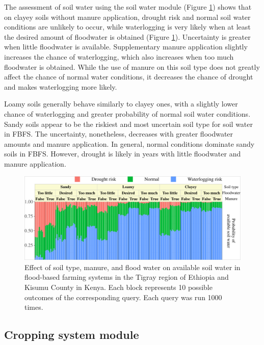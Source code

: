 \documentclass[]{elsarticle} %
\begin{document}
The assessment of soil water using the soil water module (Figure \ref{fig:fig6}) shows that on clayey soils without manure application, drought risk and normal soil water conditions are unlikely to occur, while waterlogging is very likely when at least the desired amount of floodwater is obtained (Figure \ref{fig:fig6}). Uncertainty is greater when little floodwater is available. Supplementary manure application slightly increases the chance of waterlogging, which also increases when too much floodwater is obtained. While the use of manure on this soil type does not greatly affect the chance of normal water conditions, it decreases the chance of drought and makes waterlogging more likely.

Loamy soils generally behave similarly to clayey ones, with a slightly lower chance of waterlogging and greater probability of normal soil water conditions. Sandy soils appear to be the riskiest and most uncertain soil type for soil water in FBFS. The uncertainty, nonetheless, decreases with greater floodwater amounts and manure application. In general, normal conditions dominate sandy soils in FBFS. However, drought is likely in years with little floodwater and manure application.

\begin{figure}[!h]

{\centering \includegraphics[width=1\linewidth,]{figures/Modelling_FBFS_factor_of_soil_water} 

}

\caption{Effect of soil type, manure, and flood water on available soil water in flood-based farming systems in the Tigray region of Ethiopia and Kisumu County in Kenya. Each block represents 10 possible outcomes of the corresponding query. Each query was run 1000 times.}\label{fig:fig6}
\end{figure}

\hypertarget{ref43}{%
\subsection{Cropping system module}\label{ref43}}
\end{document}
